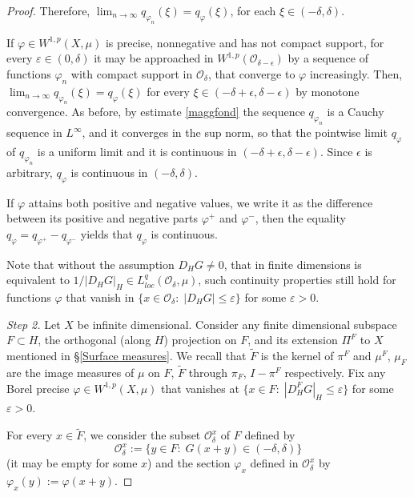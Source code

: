 \documentclass[reqno,twoside,12pt]{amsart}
\begin{document}
\begin{proof}
Therefore, $\lim_{n\to\infty}q_{\varphi_n}(\xi) = q_{\varphi}(\xi)$, for each $\xi\in (-\delta, \delta)$. 

If  $\varphi \in W^{1,p}(X, \mu)$ is precise, nonnegative  and has not compact support, for every $\varepsilon \in (0, \delta)$
it may be approached in $W^{1,p}({\mathcal O}_{\delta -\epsilon})$ by a sequence of   functions $\varphi_n$ with compact support in ${\mathcal O}_{\delta}$,   that converge to $\varphi $ increasingly.    
Then, $\lim_{n\to\infty}q_{\varphi_n}(\xi) = q_{\varphi}(\xi)$ for every $\xi\in (-\delta + \epsilon, \delta - \epsilon)$ by monotone convergence. As before, by estimate  \eqref{maggfond} the sequence $q_{\varphi_n}$ is a Cauchy sequence in $L^{\infty}$, and  it converges in the sup norm, so that  the  pointwise limit $q_{\varphi}$ of $q_{\varphi_n}$ is  a uniform limit and  it is continuous in $(-\delta + \epsilon, \delta - \epsilon)$. Since $ \epsilon $ is arbitrary,  $q_{\varphi}$ is continuous in $(-\delta, \delta)$. 

If $\varphi $ attains both positive and negative values, we write it as the difference between its positive and negative parts $\varphi^+$ and $\varphi^-$, then the equality $q_{\varphi} = q_{\varphi^+} - q_{\varphi^-}$ yields that $q_{\varphi} $ is continuous. 

Note that without the assumption  $D_HG\neq 0$, that in finite dimensions is equivalent to $1/|D_HG |_H \in L^{q}_{loc}({\mathcal O}_{\delta} , \mu)$, such continuity properties still hold for functions $\varphi$ that vanish  in $\{ x\in {\mathcal O}_{\delta}:\; |D_HG|\leq \varepsilon\}$ for some $ \varepsilon >0$. 
 
 \vspace{3mm}
 
{\em Step 2.} Let $X$ be infinite dimensional. Consider any finite dimensional subspace $F\subset H$, the orthogonal (along $H$) projection on $F$, and its extension $\Pi^F$ to $X$ mentioned in \S \ref{Surface measures}. We recall that $\widetilde{F}$ is  the kernel  of $\pi^F$ and $\mu^F$, $\mu_F$ are  the image measures of $\mu$ on $F$, $\widetilde{F}$   through $\pi_F$,    $I-\pi^F$ respectively. Fix any Borel precise $\varphi \in W^{1,p}(X, \mu)$ that vanishes at 
$\{ x\in F:\; |D_H^F G|_H \leq \varepsilon \}$ for some $ \varepsilon>0$. 

For every $x\in \widetilde{F}$, we consider the subset  ${\mathcal O}_{\delta}^x$ of $F$ defined by 
$${\mathcal O}_{\delta}^x:= \{y\in F:\; G(x+y)\in (-\delta, \delta)\}$$ 
(it may be empty for some $x$) and the section  $\varphi_x$ defined in ${\mathcal O}_{\delta}^x$ by $\varphi_x(y) := \varphi(x+y)$. 


\end{proof}
\end{document}
